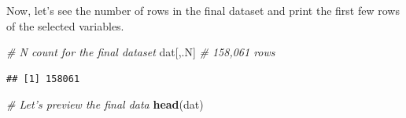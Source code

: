 \documentclass[]{book}
\newenvironment{Shaded}{\begin{snugshade}}{\end{snugshade}}
\newcommand{\CommentTok}[1]{\textcolor[rgb]{0.56,0.35,0.01}{\textit{#1}}}
\newcommand{\ControlFlowTok}[1]{\textcolor[rgb]{0.13,0.29,0.53}{\textbf{#1}}}
\newcommand{\KeywordTok}[1]{\textcolor[rgb]{0.13,0.29,0.53}{\textbf{#1}}}
\newcommand{\NormalTok}[1]{#1}
\newcommand{\OperatorTok}[1]{\textcolor[rgb]{0.81,0.36,0.00}{\textbf{#1}}}
\newcommand{\StringTok}[1]{\textcolor[rgb]{0.31,0.60,0.02}{#1}}
\begin{document}
\begin{Shaded}
\begin{Highlighting}[]
{{{    \ControlFlowTok{else} \ControlFlowTok{if}\NormalTok{ (x }\OperatorTok{%
    \ControlFlowTok{else} \ControlFlowTok{if}\NormalTok{ (x }\OperatorTok{%
    \ControlFlowTok{else} \ControlFlowTok{if}\NormalTok{ (x }\OperatorTok{%
\NormalTok{    \}))}
\NormalTok{  )]}
\end{Highlighting}
\end{Shaded}

Now, let's see the number of rows in the final dataset and print the first few rows of the selected variables.

\begin{Shaded}
\begin{Highlighting}[]
\CommentTok{# N count for the final dataset}
\NormalTok{dat[,.N] }\CommentTok{# 158,061 rows}
\end{Highlighting}
\end{Shaded}

\begin{verbatim}
## [1] 158061
\end{verbatim}

\begin{Shaded}
\begin{Highlighting}[]
\CommentTok{# Let's preview the final data}
\KeywordTok{head}\NormalTok{(dat)}
\end{Highlighting}
\end{Shaded}
\end{document}
